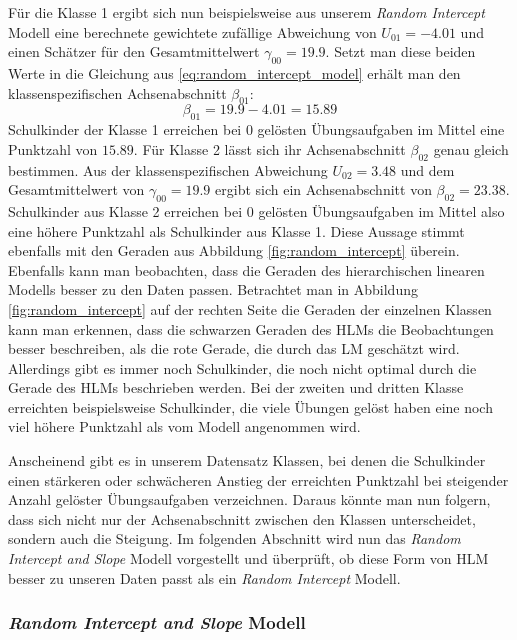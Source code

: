 \documentclass[12pt]{article}\usepackage[]{graphicx}\usepackage[]{color}
\begin{document}
Für die Klasse 1 ergibt sich nun beispielsweise aus unserem \textit{Random Intercept} Modell eine berechnete gewichtete zufällige Abweichung von $U_{01} = -4.01$ und einen Schätzer für den Gesamtmittelwert $\gamma_{00} = 19.9$. Setzt man diese beiden Werte in die Gleichung aus \eqref{eq:random_intercept_model} erhält man den klassenspezifischen Achsenabschnitt $\beta_{01}$:
\begin{equation}
\beta_{01} = 19.9 - 4.01 = 15.89
\end{equation} 
Schulkinder der Klasse 1 erreichen bei $0$ gelösten Übungsaufgaben im Mittel eine Punktzahl von $15.89$. Für Klasse 2 lässt sich ihr Achsenabschnitt $\beta_{02}$ genau gleich bestimmen. Aus der klassenspezifischen Abweichung $U_{02} = 3.48$ und dem Gesamtmittelwert von $\gamma_{00} = 19.9$ ergibt sich ein Achsenabschnitt von $\beta_{02} = 23.38$. Schulkinder aus Klasse 2 erreichen bei 0 gelösten Übungsaufgaben im Mittel also eine höhere Punktzahl als Schulkinder aus Klasse 1. Diese Aussage stimmt ebenfalls mit den Geraden aus Abbildung \ref{fig:random_intercept} überein. Ebenfalls kann man beobachten, dass die Geraden des hierarchischen linearen Modells besser zu den Daten passen. Betrachtet man in Abbildung \ref{fig:random_intercept} auf der rechten Seite die Geraden der einzelnen Klassen kann man erkennen, dass die schwarzen Geraden des HLMs die Beobachtungen besser beschreiben, als die rote Gerade, die durch das LM geschätzt wird. Allerdings gibt es immer noch Schulkinder, die noch nicht optimal durch die Gerade des HLMs beschrieben werden. Bei der zweiten und dritten Klasse erreichten beispielsweise Schulkinder, die viele Übungen gelöst haben eine noch viel höhere Punktzahl als vom Modell angenommen wird. 

Anscheinend gibt es in unserem Datensatz Klassen, bei denen die Schulkinder einen stärkeren oder schwächeren Anstieg der erreichten Punktzahl bei steigender Anzahl gelöster Übungsaufgaben verzeichnen. Daraus könnte man nun folgern, dass sich nicht nur der Achsenabschnitt zwischen den Klassen unterscheidet, sondern auch die Steigung. Im folgenden Abschnitt wird nun das \textit{Random Intercept and Slope} Modell vorgestellt und überprüft, ob diese Form von HLM besser zu unseren Daten passt als ein \textit{Random Intercept} Modell.

\subsubsection{\textit{Random Intercept and Slope} Modell} \label{section:random_intercept_slope_model}
\end{document}
